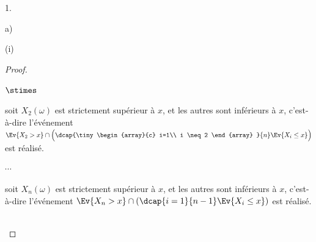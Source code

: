\documentclass[11pt]{article}%
\begin{document}
\begin{noliste}{1.}
\begin{noliste}{a)}
\begin{nonoliste}{(i)}
\begin{proof}
\begin{liste}{$\stimes$}
          \item soit $X_2(\omega)$ est strictement 
          supérieur à $x$, et les autres sont inférieurs à $x$, 
          c'est-à-dire l'événement $\Ev{X_2 >x} \cap \Big(
          \dcap{\tiny
          \begin{array}{c}
            i=1\\
            i \neq 2
          \end{array}
          }{n} \Ev{X_i \leq x}\Big)$ est réalisé.
          
          \item $\cdots$
          
          \item soit $X_n(\omega)$ est strictement 
          supérieur à $x$, et les autres sont inférieurs à $x$, 
          c'est-à-dire l'événement $\Ev{X_n >x} \cap \left(
          \dcap{i=1}{n-1} \Ev{X_i \leq x}\right)$ est réalisé.
        \end{liste}
        
        ~\\[-1cm]
      \end{proof}
      

\end{nonoliste}
\end{noliste}
\end{noliste}
\end{document}
